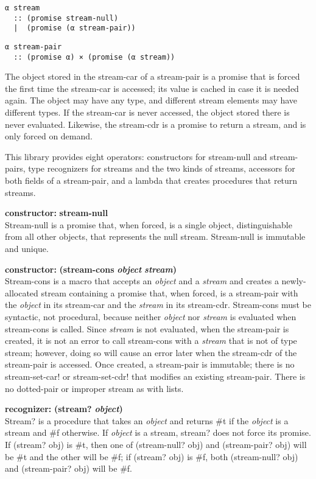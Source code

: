 \begin{verbatim}
α stream
  :: (promise stream-null)
  |  (promise (α stream-pair))
\end{verbatim}

\begin{verbatim}
α stream-pair
  :: (promise α) × (promise (α stream))
\end{verbatim}

The object stored in the stream-car of a stream-pair is a promise that
is forced the first time the stream-car is accessed; its value is cached
in case it is needed again. The object may have any type, and different
stream elements may have different types. If the stream-car is never
accessed, the object stored there is never evaluated. Likewise, the
stream-cdr is a promise to return a stream, and is only forced on
demand.

This library provides eight operators: constructors for stream-null and
stream-pairs, type recognizers for streams and the two kinds of streams,
accessors for both fields of a stream-pair, and a lambda that creates
procedures that return streams.

\textbf{constructor:} \textbf{stream-null}\\
Stream-null is a promise that, when forced, is a single object,
distinguishable from all other objects, that represents the null stream.
Stream-null is immutable and unique.

\textbf{constructor:} \textbf{(stream-cons} \textbf{\emph{object}}
\textbf{} \textbf{\emph{stream})}\\
Stream-cons is a macro that accepts an \emph{object} and a \emph{stream}
and creates a newly-allocated stream containing a promise that, when
forced, is a stream-pair with the \emph{object} in its stream-car and
the \emph{stream} in its stream-cdr. Stream-cons must be syntactic, not
procedural, because neither \emph{object} nor \emph{stream} is evaluated
when stream-cons is called. Since \emph{stream} is not evaluated, when
the stream-pair is created, it is not an error to call stream-cons with
a \emph{stream} that is not of type stream; however, doing so will cause
an error later when the stream-cdr of the stream-pair is accessed. Once
created, a stream-pair is immutable; there is no stream-set-car! or
stream-set-cdr! that modifies an existing stream-pair. There is no
dotted-pair or improper stream as with lists.

\textbf{recognizer:} \textbf{(stream?} \textbf{\emph{object})}\\
Stream? is a procedure that takes an \emph{object} and returns \#t if
the \emph{object} is a stream and \#f otherwise. If \emph{object} is a
stream, stream? does not force its promise. If (stream? obj) is \#t,
then one of (stream-null? obj) and (stream-pair? obj) will be \#t and
the other will be \#f; if (stream? obj) is \#f, both (stream-null? obj)
and (stream-pair? obj) will be \#f.

